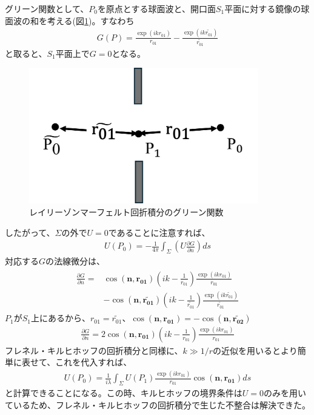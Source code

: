\documentclass[a4paper,11pt,uplatex]{jsbook}
\begin{document}
グリーン関数として、$P_0$を原点とする球面波と、開口面$S_1$平面に対する鏡像の球面波の和を考える(図\ref{fig:diff_ray})。すなわち
\begin{eqnarray}
  G(P) = \frac{\exp(ikr_{01})}{r_{01}} -\frac{\exp(ik\tilde{r_{01}})}{\tilde{r_{01}}}
\end{eqnarray}
と取ると、$S_1$平面上で$G =0$となる。
\begin{figure}[h]
  \centering
  \includegraphics[width=10cm]{image/2-diffraction_ray.png}
  \caption[レイリーゾンマーフェルト積分の座標系]{レイリーゾンマーフェルト回折積分のグリーン関数}\label{fig:diff_ray}
\end{figure}
したがって、$\Sigma$の外で$U =0 $であることに注意すれば、
\begin{eqnarray}
  U(P_0) = -\frac{1}{4\pi}\int_{\Sigma} \left( U\frac{\partial G}{\partial n} \right) ds
\end{eqnarray}
対応する$G$の法線微分は、
\begin{eqnarray}
  \begin{split}
  \frac{\partial G}{\partial n} = &\cos(\bm{n},\bm{r_{01}})\left(ik - \frac{1}{r_{01}}\right)\frac{\exp(ikr_{01})}{r_{01}} \\
  &- \cos(\bm{n},\bm{\tilde{r_{01}}})\left(ik - \frac{1}{\tilde{r_{01}}}\right)\frac{\exp(ik\tilde{r_{01}})}{\tilde{r_{01}}}
  \end{split}
\end{eqnarray}
$P_1$が$S_1$上にあるから、$r_{01} = \tilde{r_{01}}$、$\cos(\bm{n},\bm{r_{01}}) = -\cos(\bm{n},\bm{\tilde{r_{02}}})$
\begin{eqnarray}
  \frac{\partial G}{\partial n} = 2\cos(\bm{n},\bm{r_{01}})\left(ik - \frac{1}{r_{01}}\right)\frac{\exp(ikr_{01})}{r_{01}}
\end{eqnarray}
フレネル・キルヒホッフの回折積分と同様に、$k \gg 1/r$の近似を用いるとより簡単に表せて、これを代入すれば、
\begin{eqnarray}
  U(P_0) = \frac{1}{i\lambda}\int_{\Sigma} U(P_1)\frac{\exp(ikr_{01})}{r_{01}}\cos(\bm{n},\bm{r_{01}})ds
\end{eqnarray}
と計算できることになる。この時、キルヒホッフの境界条件は$U=0$のみを用いているため、フレネル・キルヒホッフの回折積分で生じた不整合は解決できた。
\end{document}
